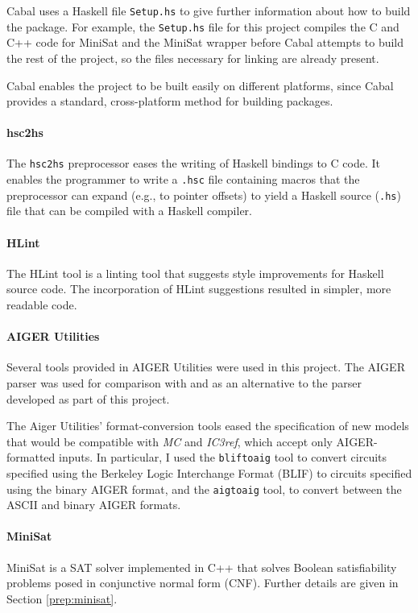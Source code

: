 \documentclass[12pt,a4paper,twoside,openright]{report}
\begin{document}
{{Cabal uses a Haskell file \verb,Setup.hs, to give further information
about how to build the package. For example, the \verb,Setup.hs, file
for this project compiles the C and C++ code for MiniSat and the MiniSat
wrapper before Cabal attempts to build the rest of the project, so the
files necessary for linking are already present.

Cabal enables the project to be built easily on different platforms,
since Cabal provides a standard, cross-platform method for building packages.}

\paragraph{hsc2hs}{
The \verb,hsc2hs, preprocessor \cite{hsc2hs} eases the writing of Haskell bindings to C
code.
It enables the programmer to write a \verb,.hsc, file containing
macros that the preprocessor can expand (e.g., to pointer offsets)
to yield a Haskell source (\verb,.hs,) file that can be compiled with a
Haskell compiler.
}

\paragraph{HLint}{
The HLint tool \cite{hlint} is a linting tool that suggests style improvements for
Haskell source code.
The incorporation of HLint suggestions resulted in simpler, more readable code.
}

\paragraph{AIGER Utilities}{
Several tools provided in AIGER Utilities \cite{aiger} were used in this project.
The
AIGER parser was used for comparison with and as an alternative
to the parser developed as part of this project. 

The Aiger Utilities' format-conversion tools
eased the specification of new models that would
be compatible with \emph{MC} and \emph{IC3ref},
which accept only AIGER-formatted inputs.
In particular, I used the {\tt bliftoaig}
tool to convert circuits specified using the Berkeley Logic Interchange Format (BLIF)
to circuits specified using the binary AIGER format, and the {\tt aigtoaig} tool,
to convert between the ASCII and binary AIGER formats. }

\paragraph{MiniSat}{
MiniSat \cite{minisat,een05}
is a SAT solver implemented in C++ that solves Boolean satisfiability problems
posed in conjunctive normal form (CNF). Further details are given in Section \ref{prep:minisat}.
}

}
\end{document}
